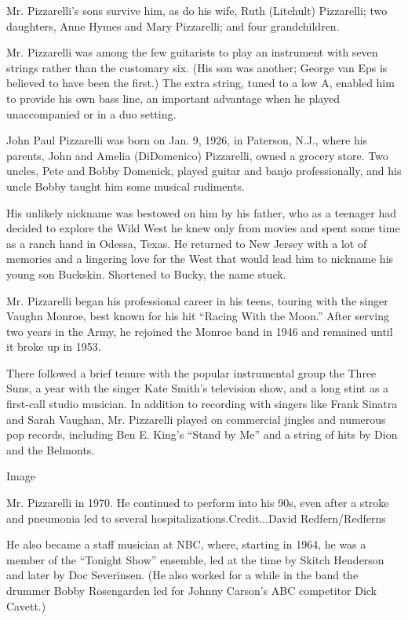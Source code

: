 Mr. Pizzarelli's sons survive him, as do his wife, Ruth (Litchult)
Pizzarelli; two daughters, Anne Hymes and Mary Pizzarelli; and four
grandchildren.

Mr. Pizzarelli was among the few guitarists to play an instrument with
seven strings rather than the customary six. (His son was another;
George van Eps is believed to have been the first.) The extra string,
tuned to a low A, enabled him to provide his own bass line, an important
advantage when he played unaccompanied or in a duo setting.

John Paul Pizzarelli was born on Jan. 9, 1926, in Paterson, N.J., where
his parents, John and Amelia (DiDomenico) Pizzarelli, owned a grocery
store. Two uncles, Pete and Bobby Domenick, played guitar and banjo
professionally, and his uncle Bobby taught him some musical rudiments.

His unlikely nickname was bestowed on him by his father, who as a
teenager had decided to explore the Wild West he knew only from movies
and spent some time as a ranch hand in Odessa, Texas. He returned to New
Jersey with a lot of memories and a lingering love for the West that
would lead him to nickname his young son Buckskin. Shortened to Bucky,
the name stuck.

Mr. Pizzarelli began his professional career in his teens, touring with
the singer Vaughn Monroe, best known for his hit ``Racing With the
Moon.'' After serving two years in the Army, he rejoined the Monroe band
in 1946 and remained until it broke up in 1953.

There followed a brief tenure with the popular instrumental group the
Three Suns, a year with the singer Kate Smith's television show, and a
long stint as a first-call studio musician. In addition to recording
with singers like Frank Sinatra and Sarah Vaughan, Mr. Pizzarelli played
on commercial jingles and numerous pop records, including Ben E. King's
``Stand by Me'' and a string of hits by Dion and the Belmonts.

Image

Mr. Pizzarelli in 1970. He continued to perform into his 90s, even after
a stroke and pneumonia led to several hospitalizations.Credit...David
Redfern/Redferns

He also became a staff musician at NBC, where, starting in 1964, he was
a member of the ``Tonight Show'' ensemble, led at the time by Skitch
Henderson and later by Doc Severinsen. (He also worked for a while in
the band the drummer Bobby Rosengarden led for Johnny Carson's ABC
competitor Dick Cavett.)

